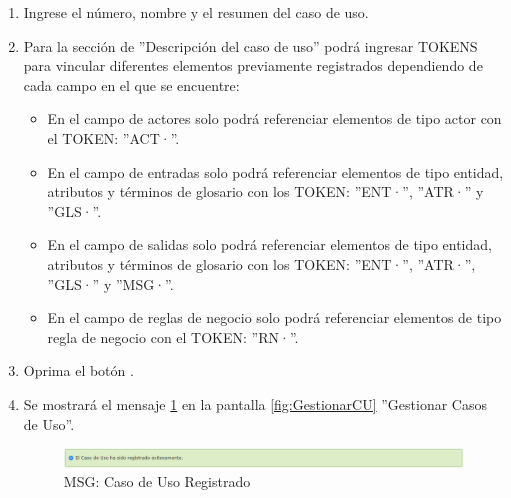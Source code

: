 \begin{enumerate}
			\item Ingrese el número, nombre  y el resumen del caso de uso.
			
			\item Para la sección de ''Descripción del caso de uso'' podrá ingresar TOKENS para vincular diferentes elementos previamente registrados dependiendo de cada campo en el que se encuentre:
			
			\begin{itemize}
				\item En el campo de actores solo podrá referenciar elementos de tipo actor con el TOKEN: ''ACT·''.
				\item En el campo de entradas solo podrá referenciar elementos de tipo entidad, atributos y términos de glosario con los TOKEN: ''ENT·'', ''ATR·'' y ''GLS·''.
				\item En el campo de salidas solo podrá referenciar elementos de tipo entidad, atributos y términos de glosario con los TOKEN: ''ENT·'', ''ATR·'', ''GLS·'' y ''MSG·''.
				\item En el campo de reglas de negocio solo podrá referenciar elementos de tipo regla de negocio con el TOKEN: ''RN·''.
			\end{itemize}
			
			\item Oprima el botón \IUAceptar.
			
			\item Se mostrará el mensaje \ref{fig:CURegistrado} en la pantalla \ref{fig:GestionarCU} ''Gestionar Casos de Uso''.
			
			\begin{figure}[htbp!]
				\begin{center}
					\includegraphics[scale=0.6]{roles/lider/casosUso/pantallas/IU12-1MSG1}
					\caption{MSG: Caso de Uso Registrado}
					\label{fig:CURegistrado}
				\end{center}
			\end{figure}
			\end{enumerate}